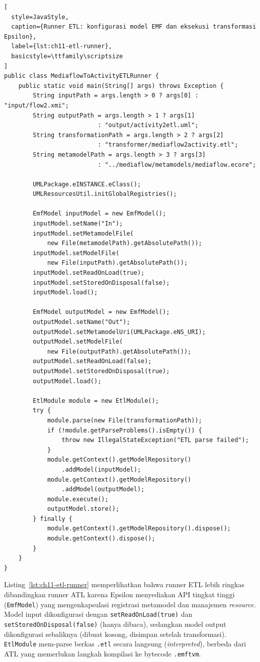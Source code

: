 \begin{lstlisting}[
  style=JavaStyle,
  caption={Runner ETL: konfigurasi model EMF dan eksekusi transformasi Epsilon},
  label={lst:ch11-etl-runner},
  basicstyle=\ttfamily\scriptsize
]
public class MediaflowToActivityETLRunner {
    public static void main(String[] args) throws Exception {
        String inputPath = args.length > 0 ? args[0] : "input/flow2.xmi";
        String outputPath = args.length > 1 ? args[1]
                          : "output/activity2etl.uml";
        String transformationPath = args.length > 2 ? args[2]
                          : "transformer/mediaflow2activity.etl";
        String metamodelPath = args.length > 3 ? args[3]
                          : "../mediaflow/metamodels/mediaflow.ecore";

        UMLPackage.eINSTANCE.eClass();
        UMLResourcesUtil.initGlobalRegistries();

        EmfModel inputModel = new EmfModel();
        inputModel.setName("In");
        inputModel.setMetamodelFile(
            new File(metamodelPath).getAbsolutePath());
        inputModel.setModelFile(
            new File(inputPath).getAbsolutePath());
        inputModel.setReadOnLoad(true);
        inputModel.setStoredOnDisposal(false);
        inputModel.load();

        EmfModel outputModel = new EmfModel();
        outputModel.setName("Out");
        outputModel.setMetamodelUri(UMLPackage.eNS_URI);
        outputModel.setModelFile(
            new File(outputPath).getAbsolutePath());
        outputModel.setReadOnLoad(false);
        outputModel.setStoredOnDisposal(true);
        outputModel.load();

        EtlModule module = new EtlModule();
        try {
            module.parse(new File(transformationPath));
            if (!module.getParseProblems().isEmpty()) {
                throw new IllegalStateException("ETL parse failed");
            }
            module.getContext().getModelRepository()
                .addModel(inputModel);
            module.getContext().getModelRepository()
                .addModel(outputModel);
            module.execute();
            outputModel.store();
        } finally {
            module.getContext().getModelRepository().dispose();
            module.getContext().dispose();
        }
    }
}
\end{lstlisting}

\noindent Listing~\ref{lst:ch11-etl-runner} memperlihatkan bahwa runner ETL lebih ringkas dibandingkan runner ATL karena Epsilon menyediakan API tingkat tinggi (\texttt{EmfModel}) yang mengenkapsulasi registrasi metamodel dan manajemen \textit{resource}. Model input dikonfigurasi dengan \texttt{setReadOnLoad(true)} dan \texttt{setStoredOnDisposal(false)} (hanya dibaca), sedangkan model output dikonfigurasi sebaliknya (dibuat kosong, disimpan setelah transformasi). \texttt{EtlModule} mem-parse berkas \texttt{.etl} secara langsung (\textit{interpreted}), berbeda dari ATL yang memerlukan langkah kompilasi ke bytecode \texttt{.emftvm}.

